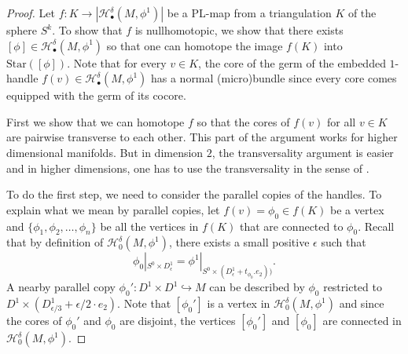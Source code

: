 \documentclass[a4paper]{amsart}
\theoremstyle{definition}
\theoremstyle{remark}
\numberwithin{equation}{section}
\begin{document}
\begin{proof}
 Let $f:K\to  |\mathcal{H}_{\bullet}^{\delta}(M,\phi^1)|$ be a PL-map from a triangulation $K$ of the sphere $S^k$. To show that $f$ is nullhomotopic, we show that there exists $[\phi]\in  \mathcal{H}_{\bullet}^{\delta}(M,\phi^1)$ so that one can homotope the image $f(K)$ into $\text{Star}([\phi])$. Note that for every $v\in K$, the core of the germ of the embedded $1$-handle $f(v)\in  \mathcal{H}_{\bullet}^{\delta}(M,\phi^1)$ has a normal (micro)bundle since every core comes equipped with the germ of its cocore. 
 
 First we  show that we can homotope $f$ so that the cores of $f(v)$ for all $v\in K$ are pairwise transverse  to each other. This part of the argument works for higher dimensional manifolds. But in dimension $2$, the transversality argument is easier and in higher dimensions, one has to use the transversality in the sense of \cite[Essay 3, section 1]{MR0645390}. 

To do the first step, we need to consider the parallel copies of the handles. To explain what we mean by parallel copies, let $f(v)=\phi_0\in f(K)$ be a vertex and $\{\phi_1,\phi_2,\dots, \phi_n\}$ be all the vertices in $f(K)$ that are connected to $\phi_0$. Recall that by definition of $\mathcal{H}_{0}^{\delta}(M,\phi^1)$, there exists a small positive $\epsilon$ such that 
\[
\phi_0|_{S^{0}\times D^{1}_{\epsilon}}=\phi^1|_{S^{0}\times(D^{1}_{\epsilon} +  t_{\phi_0}. e_{2}))}.
\]
A nearby parallel copy $\phi_0':D^1\times D^{1}\hookrightarrow M$  can be described by $\phi_0$ restricted to $D^1\times (D^{1}_{\epsilon/3}+\epsilon/2 \cdot e_{2})$.  Note that $[\phi_0']$ is a vertex in $\mathcal{H}_{0}^{\delta}(M,\phi^1)$ and since the cores of $\phi_0'$ and $\phi_0$ are disjoint, the vertices  $[\phi_0']$ and $[\phi_0]$ are connected in $\mathcal{H}_{0}^{\delta}(M,\phi^1)$.


\end{proof}
\end{document}

